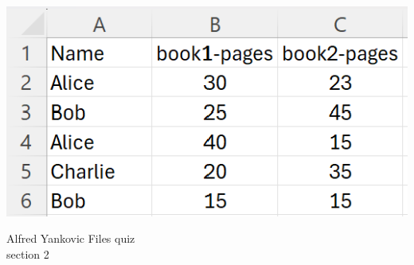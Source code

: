 \documentclass{article}
\begin{document}
\begin{enumerate}
		\begin{flushright}
			\includegraphics[scale=.65]{imgs/PagesReadData.PNG}
		\end{flushright}


\end{enumerate}
\pagebreak
Alfred Yankovic \hfill Files quiz\\
section 2\\
\end{document}
